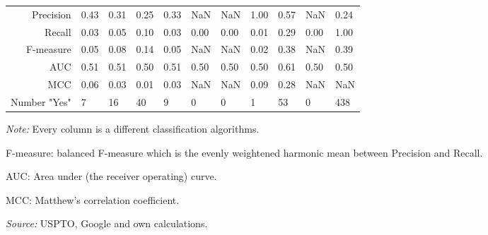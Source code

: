 \begin{table}
\begin{small}
\begin{threeparttable}
\begin{tabular}{rllllllllll}
Precision & 0.43 & 0.31 & 0.25 & 0.33 & NaN & NaN & 1.00 & 0.57 & NaN & 0.24  \tabularnewline 
Recall & 0.03 & 0.05 & 0.10 & 0.03 & 0.00 & 0.00 & 0.01 & 0.29 & 0.00 & 1.00  \tabularnewline 
F-measure & 0.05 & 0.08 & 0.14 & 0.05 & NaN & NaN & 0.02 & 0.38 & NaN & 0.39  \tabularnewline 
AUC & 0.51 & 0.51 & 0.50 & 0.51 & 0.50 & 0.50 & 0.50 & 0.61 & 0.50 & 0.50  \tabularnewline 
MCC & 0.06 & 0.03 & 0.01 & 0.03 & NaN & NaN & 0.09 & 0.28 & NaN & NaN  \tabularnewline 
Number "Yes" & 7 & 16 & 40 & 9 & 0 & 0 & 1 & 53 & 0 & 438  \tabularnewline 
\bottomrule 
\end{tabular} 
\begin{tablenotes}
\small
\item\textit{Note:} Every column is a different classification algorithms.
\item F-measure: balanced F-measure which is the evenly weightened harmonic mean between Precision and Recall. 
\item AUC: Area under (the receiver operating) curve.
\item MCC: Matthew's correlation coefficient.
\item\textit{Source:} USPTO, Google and own calculations.
\end{tablenotes}
\end{threeparttable}
\end{small}
\end{table}
